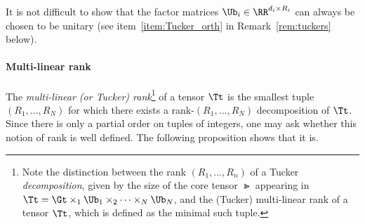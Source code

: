 It is not difficult to show that the factor matrices
$\Ub_i \in \RR^{d_i \times R_i}$ can always be chosen to be unitary (see
item~\ref{item:Tucker_orth} in Remark~\ref{rem:tuckers} below).


\paragraph{Multi-linear rank} The \emph{multi-linear (or Tucker) rank}\footnote{Note the distinction between the rank $(R_1,\dots,R_n)$ of a Tucker \emph{decomposition},
given by the size of the core tensor $\Gt$ appearing in
$\Tt = \Gt \times_1 \Ub_1 \times_2 \dots \times_N \Ub_N$, and the
(Tucker) multi-linear rank of a tensor $\Tt$, which is defined as the
minimal such tuple.} of a tensor $\Tt$ is the smallest tuple $(R_1,\dots,R_N)$
for which there exists a rank-$(R_1,\dots,R_N)$ decomposition of $\Tt$. Since there is only 
a partial order on tuples of integers, one may ask whether this notion of rank is well defined. 
The following proposition shows that it is. 

